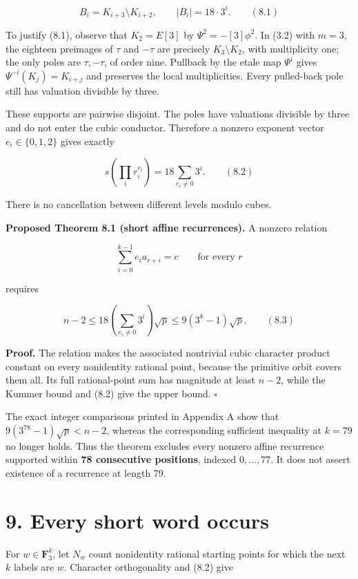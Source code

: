 \documentclass[
  11pt,
  a4paper,
]{article}
\begin{document}
\[
B_i=K_{i+3}\setminus K_{i+2},\qquad |B_i|=18\cdot3^i. \qquad (8.1)
\]

To justify (8.1), observe that \(K_2=E[3]\) by \(\Psi^2=-[3]\phi^2\). In
(3.2) with \(m=3\), the eighteen preimages of \(\tau\) and \(-\tau\) are
precisely \(K_3\setminus K_2\), with multiplicity one; the only poles
are \(\tau,-\tau\), of order nine. Pullback by the etale map \(\Psi^i\)
gives \(\Psi^{-i}(K_j)=K_{i+j}\) and preserves the local multiplicities.
Every pulled-back pole still has valuation divisible by three.

These supports are pairwise disjoint. The poles have valuations
divisible by three and do not enter the cubic conductor. Therefore a
nonzero exponent vector \(e_i\in\{0,1,2\}\) gives exactly

\[
s\left(\prod_i r_i^{e_i}\right)=18\sum_{e_i\neq0}3^i. \qquad (8.2)
\]

There is no cancellation between different levels modulo cubes.

\textbf{Proposed Theorem 8.1 (short affine recurrences).} A nonzero
relation

\[
\sum_{i=0}^{k-1}e_i a_{r+i}=c\qquad\text{for every }r
\]

requires

\[
n-2\leq18\left(\sum_{e_i\neq0}3^i\right)\sqrt p
\leq9(3^k-1)\sqrt p. \qquad (8.3)
\]

\textbf{Proof.} The relation makes the associated nontrivial cubic
character product constant on every nonidentity rational point, because
the primitive orbit covers them all. Its full rational-point sum has
magnitude at least \(n-2\), while the Kummer bound and (8.2) give the
upper bound. \(\square\)

The exact integer comparisons printed in Appendix A show that
\(9(3^{78}-1)\sqrt p<n-2\), whereas the corresponding sufficient
inequality at \(k=79\) no longer holds. Thus the theorem excludes every
nonzero affine recurrence supported within \textbf{78 consecutive
positions}, indexed \(0,\ldots,77\). It does not assert existence of a
recurrence at length 79.

\section{9. Every short word occurs}\label{every-short-word-occurs}

For \(w\in\mathbf F_3^k\), let \(N_w\) count nonidentity rational
starting points for which the next \(k\) labels are \(w\). Character
orthogonality and (8.2) give
\end{document}
